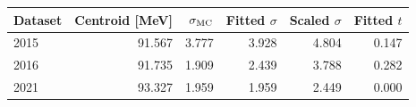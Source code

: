 \begin{tabular}{lrrrrr}\toprule
Dataset & Centroid [MeV] & $\sigma_{\rm MC}$ & Fitted $\sigma$ & Scaled $\sigma$ & Fitted $t$\\\midrule
2015 & 91.567 & 3.777 & 3.928 & 4.804 & 0.147\\
2016 & 91.735 & 1.909 & 2.439 & 3.788 & 0.282\\
2021 & 93.327 & 1.959 & 1.959 & 2.449 & 0.000\\
\bottomrule\end{tabular}
